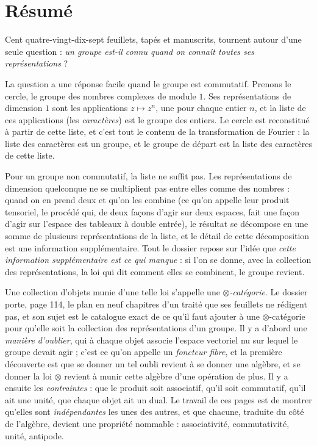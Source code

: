 \documentclass[11pt,a4paper]{article}
\begin{document}
\section*{Résumé}

\begin{resume}
Cent quatre-vingt-dix-sept feuillets, tapés et manuscrits, tournent autour
d'une seule question : \emph{un groupe est-il connu quand on connaît toutes ses
représentations} ?

La question a une réponse facile quand le groupe est commutatif. Prenons le
cercle, le groupe des nombres complexes de module $1$. Ses représentations de
dimension $1$ sont les applications $z \mapsto z^{n}$, une pour chaque entier
$n$, et la liste de ces applications (les \emph{caractères}) est
le groupe des entiers. Le cercle est reconstitué à partir de cette
liste, et c'est tout le contenu de la transformation de Fourier : la liste des
caractères est un groupe, et le groupe de départ est la liste des caractères de
cette liste.

Pour un groupe non commutatif, la liste ne suffit pas. Les représentations de
dimension quelconque ne se multiplient pas entre elles comme des nombres :
quand on en prend deux et qu'on les combine (ce qu'on appelle leur produit
tensoriel, le procédé qui, de deux façons d'agir sur deux espaces, fait une
façon d'agir sur l'espace des tableaux à double entrée), le résultat se
décompose en une somme de plusieurs représentations de la liste, et le détail de cette décomposition est une information supplémentaire. Tout le
dossier repose sur l'idée que \emph{cette information supplémentaire est ce
qui manque} : si l'on se donne, avec la collection des représentations, la loi
qui dit comment elles se combinent, le groupe revient.

Une collection d'objets munie d'une telle loi s'appelle une
\emph{$\otimes$-catégorie}. Le dossier porte, page 114, le plan en neuf
chapitres d'un traité que ses feuillets ne rédigent pas, et son sujet est le
catalogue exact de ce qu'il faut ajouter à une $\otimes$-catégorie pour
qu'elle soit la collection des représentations d'un groupe. Il y a d'abord une \emph{manière d'oublier}, qui à chaque objet
associe l'espace vectoriel nu sur lequel le groupe devait agir ; c'est ce qu'on
appelle un \emph{foncteur fibre}, et la première découverte est que se donner
un tel oubli revient à se donner une algèbre, et se donner la loi $\otimes$
revient à munir cette algèbre d'une opération de plus. Il y a ensuite les
\emph{contraintes} : que le produit soit associatif, qu'il soit commutatif,
qu'il ait une unité, que chaque objet ait un dual. Le travail de ces pages est
de montrer qu'elles sont \emph{indépendantes} les unes des autres, et que
chacune, traduite du côté de l'algèbre, devient une propriété nommable :
associativité, commutativité, unité, antipode.


\end{resume}
\end{document}
